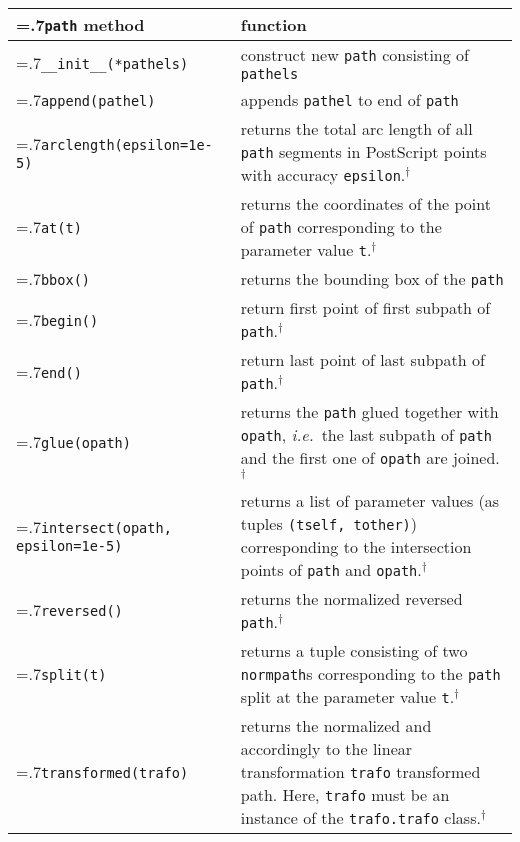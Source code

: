 \medskip
\begin{tabularx}{\linewidth}{>{\hsize=.7\hsize}X>{\raggedright\arraybackslash\hsize=1.3\hsize}X}
  \texttt{path} method & function \\
  \hline 
  \texttt{\_\_init\_\_(*pathels)} & construct new \texttt{path}
  consisting of \texttt{pathels}\\
  \texttt{append(pathel)} & appends \texttt{pathel} to end of \texttt{path}\\
  \texttt{arclength(epsilon=1e-5)} & returns the total arc length of
  all \texttt{path} segments in  PostScript points with accuracy 
  \texttt{epsilon}.$^\dagger$\\
  \texttt{at(t)} & returns the coordinates of the point of
  \texttt{path} corresponding to the parameter value
  \texttt{t}.$^\dagger$\\
  \texttt{bbox()} & returns the bounding box of the \texttt{path}\\
  \texttt{begin()} & return first point of first subpath of
  \texttt{path}.$^\dagger$\\
  \texttt{end()} & return last point of last subpath of
  \texttt{path}.$^\dagger$\\
  \texttt{glue(opath)} & returns the \texttt{path} glued together with
  \texttt{opath}, \textit{i.e.}\ the last subpath of \texttt{path}
  and the first one of \texttt{opath} are joined.$^\dagger$\\
  \texttt{intersect(opath, \newline\phantom{intersect(}epsilon=1e-5)} &
  returns a list of parameter values (as tuples \texttt{(tself, tother)}) corresponding to the 
  intersection points of \texttt{path} and \texttt{opath}.$^\dagger$\\
  \texttt{reversed()} & returns the normalized reversed
  \texttt{path}.$^\dagger$\\
  \texttt{split(t)} & returns a tuple consisting of two
  \texttt{normpath}s corresponding to the \texttt{path} split at
  the parameter value \texttt{t}.$^\dagger$\\
  \texttt{transformed(trafo)} & returns the normalized and accordingly
  to the linear transformation \texttt{trafo} transformed path. Here,
  \texttt{trafo} must be an   instance of the \texttt{trafo.trafo} class.$^\dagger$
\end{tabularx} 
\medskip

